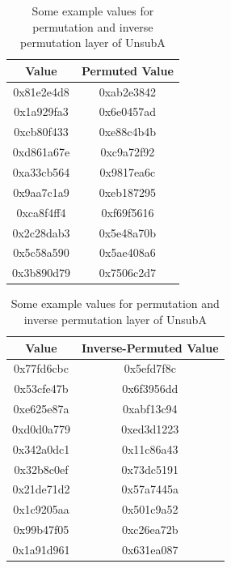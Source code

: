 \documentclass[12pt,a4paper]{article}
\begin{document}
\begin{table}[P]
\centering
\begin{subtable}[b]{\textwidth}
    \centering
    \begin{tabular}{|c||c|}
    \hline
    Value & Permuted Value \\ \hline \hline
    0x81e2e4d8 & 0xab2e3842 \\ \hline
    0x1a929fa3 & 0x6e0457ad \\ \hline
    0xcb80f433 & 0xe88c4b4b \\ \hline
    0xd861a67e & 0xc9a72f92 \\ \hline
    0xa33cb564 & 0x9817ea6c \\ \hline
    0x9aa7c1a9 & 0xeb187295 \\ \hline
    0xca8f4ff4 & 0xf69f5616 \\ \hline
    0x2c28dab3 & 0x5e48a70b \\ \hline
    0x5c58a590 & 0x5ae408a6 \\ \hline
    0x3b890d79 & 0x7506c2d7 \\ \hline
    \end{tabular}
    \caption{Permuted Values}
\end{subtable}
\begin{subtable}[b]{\textwidth}
    \centering
    \begin{tabular}{|c||c|} 
    \hline
    Value & Inverse-Permuted Value \\ \hline \hline
    0x77fd6cbc & 0x5efd7f8c \\ \hline
    0x53cfe47b & 0x6f3956dd \\ \hline
    0xe625e87a & 0xabf13c94 \\ \hline
    0xd0d0a779 & 0xed3d1223 \\ \hline
    0x342a0dc1 & 0x11c86a43 \\ \hline
    0x32b8c0ef & 0x73dc5191 \\ \hline
    0x21de71d2 & 0x57a7445a \\ \hline
    0x1c9205aa & 0x501c9a52 \\ \hline
    0x99b47f05 & 0xc26ea72b \\ \hline
    0x1a91d961 & 0x631ea087 \\ \hline
    \end{tabular}
   \caption{Inverse-Permuted Values}
\end{subtable}
\caption[Permutation Layer Example Values for UnsubA]{Some example values for
permutation and inverse permutation layer of UnsubA}
\label{tab:perm_example}
\end{table}
\end{document}
